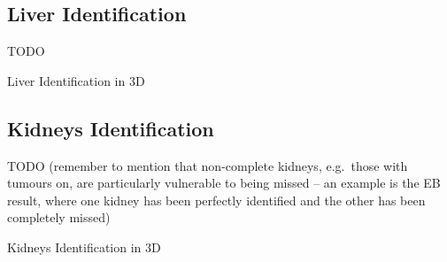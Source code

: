 \afterpage{\clearpage}
\newpage

\subsection{Liver Identification}

TODO

\begin{stulisting}[p]
\caption{Liver Identification in 3D}
\label{code:featureid-3d-liveridentification}

\end{stulisting}

\afterpage{\clearpage}
\newpage

\subsection{Kidneys Identification}

TODO (remember to mention that non-complete kidneys, e.g.~those with tumours on, are particularly vulnerable to being missed -- an example is the EB result, where one kidney has been perfectly identified and the other has been completely missed)

\begin{stulisting}[p]
\caption{Kidneys Identification in 3D}
\label{code:featureid-3d-kidneysidentification}

\end{stulisting}

